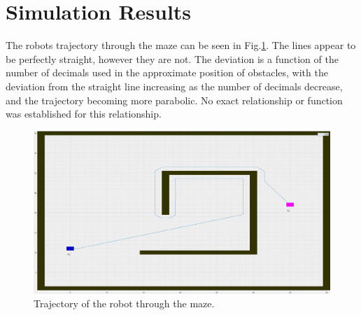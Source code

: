 \section{Simulation Results}

The robots trajectory through the maze can be seen in Fig.\:\ref{fig:robot_path}. The lines appear to be perfectly straight, however they are not. The deviation is a function of the number of decimals used in the approximate position of obstacles, with the deviation from the straight line increasing as the number of decimals decrease, and the trajectory becoming more parabolic. No exact relationship or function was established for this relationship.
\begin{figure}
    \centering
    \includegraphics[width=\columnwidth]{images/robot_path.png}
    \caption{Trajectory of the robot through the maze.}
    \label{fig:robot_path}
\end{figure}


